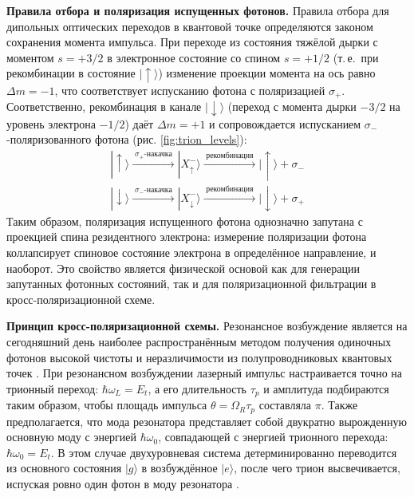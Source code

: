 \documentclass[11pt]{article}    %
\numberwithin{equation}{section}
\begin{document}
\medskip
\textbf{Правила отбора и поляризация испущенных фотонов.}
Правила отбора для дипольных оптических переходов в квантовой точке
определяются законом сохранения момента импульса.
При переходе из состояния тяжёлой дырки с моментом $s = +3/2$ в электронное
состояние со спином $s = +1/2$ (т.\,е.\ при рекомбинации в состояние
$|\uparrow\rangle$) изменение проекции момента на ось равно
$\Delta m = -1$, что соответствует испусканию фотона с поляризацией
$\sigma_+$.
Соответственно, рекомбинация в канале $|\downarrow\rangle$ (переход с
момента дырки $-3/2$ на уровень электрона $-1/2$) даёт $\Delta m = +1$ и
сопровождается испусканием $\sigma_-$-поляризованного фотона \cite{yugova2009} (рис. \ref{fig:trion_levels}):
\begin{gather}
    |\!\uparrow\rangle \xrightarrow{\;\sigma_+\text{-накачка}\;}
    |X^-_{\uparrow}\rangle \xrightarrow{\;\text{рекомбинация}\;}
    |\!\uparrow\rangle + \sigma_-
    \\ \nonumber
    |\!\downarrow\rangle \xrightarrow{\;\sigma_-\text{-накачка}\;}
    |X^-_{\downarrow}\rangle \xrightarrow{\;\text{рекомбинация}\;}
    |\!\downarrow\rangle + \sigma_+
\end{gather}
Таким образом, поляризация испущенного фотона однозначно запутана
с проекцией спина резидентного электрона: измерение поляризации фотона
коллапсирует спиновое состояние электрона в определённое направление,
и наоборот.
Это свойство является физической основой как для генерации
запутанных фотонных состояний, так и для поляризационной фильтрации в
кросс-поляризационной схеме.

\medskip
\textbf{Принцип кросс-поляризационной схемы.}
Резонансное возбуждение является на сегодняшний день наиболее
распространённым методом получения одиночных фотонов высокой чистоты и
неразличимости из полупроводниковых квантовых точек
\cite{matthiesen2012, senellart2017, tomm2021, muller2007}.
При резонансном возбуждении лазерный импульс настраивается точно на
трионный переход: $\hbar\omega_L = E_t$, а его длительность
$\tau_p$ и амплитуда подбираются таким образом, чтобы площадь импульса
$\theta = \Omega_R \tau_p$ составляла $\pi$.
Также предполагается, что мода резонатора представляет собой двукратно
вырожденную основную моду с энергией $\hbar\omega_0$, совпадающей с энергией
трионного перехода: $\hbar\omega_0 = E_t$.
В этом случае двухуровневая система детерминированно переводится из основного
состояния $|g\rangle$ в возбуждённое $|e\rangle$, после чего трион
высвечивается, испуская ровно один фотон в моду резонатора \cite{kuhlmann2015}.
\end{document}
